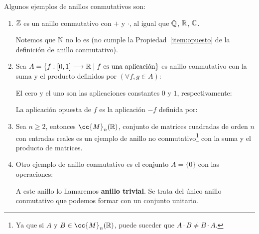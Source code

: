 \begin{ejemplo}
    Algunos ejemplos de anillos conmutativos son:
    \begin{enumerate}
        \item $\mathbb Z$ es un anillo conmutativo con $+$ y $\cdot$, al igual que $\mathbb Q$, $\mathbb R$, $\mathbb C$.
        
        Notemos que $\mathbb N$ no lo es (no cumple la Propiedad~\ref{item:opuesto} de la definición de anillo conmutativo).

        \item Sea $A = \{f:[0,1] \longrightarrow \mathbb R \mid f \mbox{ es una aplicación}\}$ es anillo conmutativo con la suma y el producto definidos por $(\forall f,g \in A)$:

        El cero y el uno son las aplicaciones constantes $0$ y $1$, respectivamente:

        La aplicación opuesta de $f$ es la aplicación $-f$ definida por:

    \item Sea $n \geq 2$, entonces $\cc{M}_n(\R)$, conjunto de matrices cuadradas de orden $n$ con entradas reales es un ejemplo de anillo no conmutativo\footnote{Ya que si $A$ y $B\in \cc{M}_n(\mathbb{R})$, puede suceder que $A\cdot B\neq B\cdot A$.} con la suma y el producto de matrices.

        \item Otro ejemplo de anillo conmutativo es el conjunto $A = \{0\}$ con las operaciones:
        
        A este anillo lo llamaremos \textbf{anillo trivial}. Se trata del único anillo conmutativo que podemos formar con un conjunto unitario.
    \end{enumerate}
\end{ejemplo}

